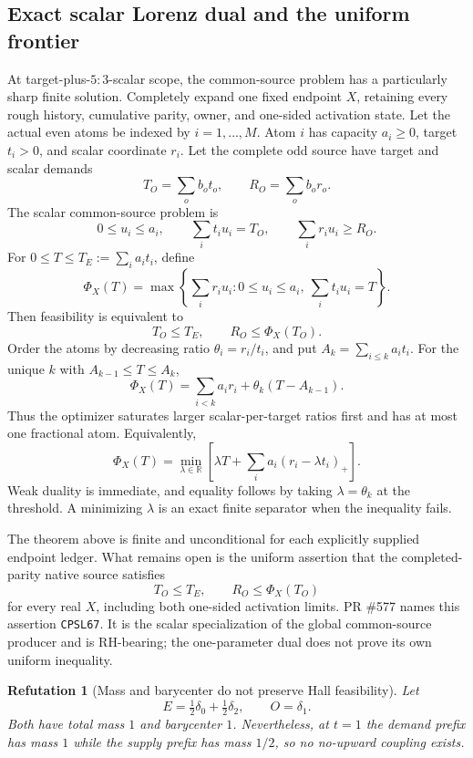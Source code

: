 \documentclass[11pt]{article}
\newtheorem{refutation}[theorem]{Refutation}
\newcommand{\1}{\mathbf 1}
\begin{document}
\subsection{Exact scalar Lorenz dual and the uniform frontier}

At target-plus-$5{:}3$-scalar scope, the common-source problem has a particularly sharp finite solution.  Completely expand one fixed endpoint $X$, retaining every rough history, cumulative parity, owner, and one-sided activation state.  Let the actual even atoms be indexed by $i=1,\ldots,M$.  Atom $i$ has capacity $a_i\ge0$, target $t_i>0$, and scalar coordinate $r_i$.  Let the complete odd source have target and scalar demands
\[
T_O=\sum_o b_ot_o,
\qquad
R_O=\sum_o b_or_o.
\]
The scalar common-source problem is
\[
0\le u_i\le a_i,
\qquad
\sum_i t_iu_i=T_O,
\qquad
\sum_i r_iu_i\ge R_O.
\]
For $0\le T\le T_E:=\sum_i a_it_i$, define
\[
\Phi_X(T)=\max\left\{\sum_i r_iu_i:
0\le u_i\le a_i,\ \sum_i t_iu_i=T\right\}.
\]
Then feasibility is equivalent to
\[
T_O\le T_E,
\qquad
R_O\le\Phi_X(T_O).
\]
Order the atoms by decreasing ratio $\theta_i=r_i/t_i$, and put
$A_k=\sum_{i\le k}a_it_i$.  For the unique $k$ with
$A_{k-1}\le T\le A_k$,
\[
\Phi_X(T)=\sum_{i<k}a_ir_i+\theta_k(T-A_{k-1}).
\]
Thus the optimizer saturates larger scalar-per-target ratios first and has at most one fractional atom.  Equivalently,
\begin{equation}\label{eq:lorenzdual}
\Phi_X(T)=\min_{\lambda\in\mathbb R}
\left[\lambda T+\sum_i a_i(r_i-\lambda t_i)_+\right].
\end{equation}
Weak duality is immediate, and equality follows by taking $\lambda=\theta_k$ at the threshold.  A minimizing $\lambda$ is an exact finite separator when the inequality fails.

The theorem above is finite and unconditional for each explicitly supplied endpoint ledger.  What remains open is the uniform assertion that the completed-parity native source satisfies
\[
T_O\le T_E,
\qquad R_O\le\Phi_X(T_O)
\]
for every real $X$, including both one-sided activation limits.  PR \#577 names this assertion \texttt{CPSL67}.  It is the scalar specialization of the global common-source producer and is RH-bearing; the one-parameter dual does not prove its own uniform inequality.

\begin{refutation}[Mass and barycenter do not preserve Hall feasibility]\label{ref:moments}
Let
\[
E=\tfrac12\delta_0+\tfrac12\delta_2,
\qquad O=\delta_1.
\]
Both have total mass $1$ and barycenter $1$.  Nevertheless, at $t=1$ the demand prefix has mass $1$ while the supply prefix has mass $1/2$, so no no-upward coupling exists.
\end{refutation}
\end{document}
